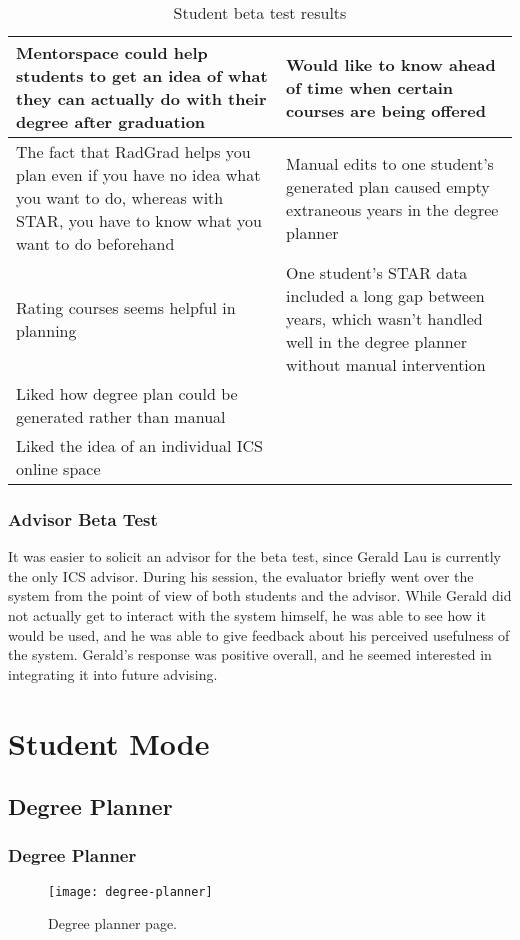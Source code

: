 \begin{table}[htbp!]
\begin{tabular}{ |p{8cm}|p{8cm}|}
 \hline
Mentorspace could help students to get an idea of what they can actually do with their degree after graduation &Would like to know ahead of time when certain courses are being offered\\
 \hline
The fact that RadGrad helps you plan even if you have no idea what you want to do, whereas with STAR, you have to know what you want to do beforehand & Manual edits to one student's generated plan caused empty extraneous years in the degree planner\\
 \hline
Rating courses seems helpful in planning & One student's STAR data included a long gap between years, which wasn't handled well in the degree planner without manual intervention\\
 \hline
Liked how degree plan could be generated rather than manual &\\
 \hline
Liked the idea of an individual ICS online space &\\
 \hline
\end{tabular}
\caption{Student beta test results}
\label{table:3}
\end{table}

\subsubsection{Advisor Beta Test}
It was easier to solicit an advisor for the beta test, since Gerald Lau is currently the only ICS advisor. During his session, the evaluator briefly went over the system from the point of view of both students and the advisor. While Gerald did not actually get to interact with the system himself, he was able to see how it would be used, and he was able to give feedback about his perceived usefulness of the system. Gerald's response was positive overall, and he seemed interested in integrating it into future advising.
\section{Student Mode}
\subsection{Degree Planner}
\subsubsection{Degree Planner}
\begin{figure}[h]
\centering
\texttt{[image: degree-planner]}
\caption{Degree planner page.}
\end{figure}

